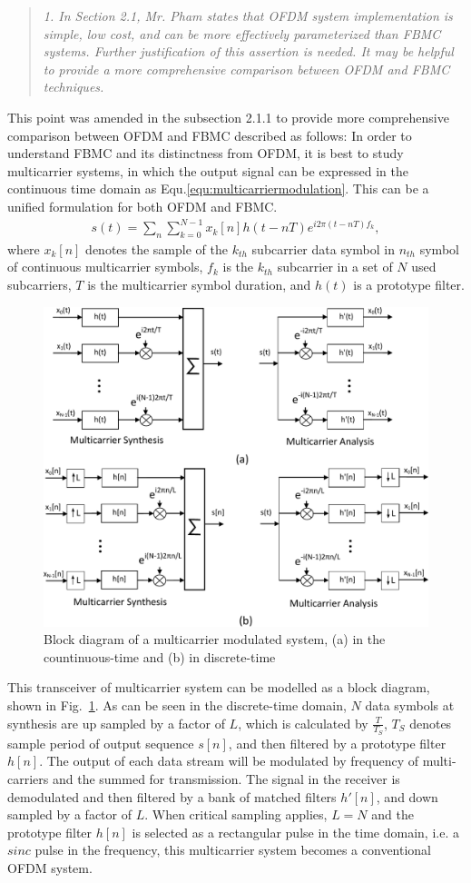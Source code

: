 \documentclass{article}
\begin{document}
\begin{quote}
\emph{1. In Section 2.1, Mr. Pham states that OFDM system implementation is simple, low cost, and can be more effectively parameterized than FBMC systems. Further justification of this assertion is needed. It may be helpful to provide a more comprehensive comparison between OFDM and FBMC techniques.}
\end{quote}
This point was amended in the subsection 2.1.1 to provide more comprehensive comparison between OFDM and FBMC described as follows:
In order to understand FBMC and its distinctness from OFDM, it is best to study multicarrier systems, in which the output signal can be expressed in the continuous time domain as Equ.\ref{equ:multicarriermodulation}. 
This can be a unified formulation for both OFDM and FBMC.
\begin{eqnarray}
\label{equ:multicarriermodulation}
s(t) = \sum_{n}\sum_{k  = 0}^{N-1} x_{k}[n] h(t-nT)e^{i2\pi (t-nT)f_{k}},
\end{eqnarray}	
where $x_{k}[n]$ denotes the sample of the $k_{th}$ subcarrier data symbol in $n_{th}$ symbol of continuous multicarrier symbols, $f_{k}$ is the $k_{th}$ subcarrier in a set of $N$ used subcarriers, $T$ is the multicarrier symbol duration, and $h(t)$ is a prototype filter.
\begin{figure}[b]
	\centerline{\includegraphics [width=0.8\columnwidth] {../Figures/multucarrier_system} }
	\caption{Block diagram of a multicarrier modulated system, (a) in the countinuous-time and (b) in discrete-time}
	\label{fig:multicarrier-block}
\end{figure}
This transceiver of multicarrier system can be modelled as a block diagram, shown in Fig.~\ref{fig:multicarrier-block}.
As can be seen in the discrete-time domain, $N$ data symbols at synthesis are up sampled by a factor of $L$, which is calculated by $\frac{T}{T_{S}}$, $T_{S}$ denotes sample period of output sequence $s[n]$, and then filtered by a prototype filter $h[n]$. The output of each data stream will be modulated by frequency of multi-carriers and the summed for transmission. 
The signal in the receiver is demodulated and then filtered by a bank of matched filters $h'[n]$, and down sampled by a factor of $L$. 
When critical sampling applies, $L = N$ and the prototype filter $h[n]$ is selected as a rectangular pulse in the time domain, i.e. a $sinc$ pulse in the frequency, this multicarrier system becomes a conventional OFDM system.
\end{document}
